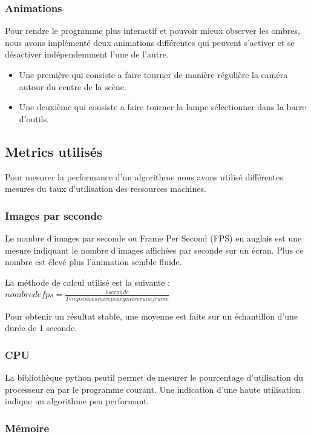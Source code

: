 \documentclass[a4paper,10pt]{report}
\begin{document}
\subsubsection{Animations}

Pour rendre le programme plus interactif et pouvoir mieux observer les ombres, nous avons implémenté deux animations différentes qui peuvent s'activer et se désactiver indépendemment l'une de l'autre.


\begin{itemize}
  \item Une première qui consiste a faire tourner de manière régulière la caméra autour du centre de la scène.
  \item Une deuxième qui consiste a faire tourner la lampe sélectionner dans la barre d'outils.
\end{itemize}

\subsection{Metrics utilisés}

Pour mesurer la performance d'un algorithme nous avons utilisé différentes mesures du taux d'utilisation des ressources machines.
\subsubsection{Images par seconde}

Le nombre d'images par seconde ou Frame Per Second (FPS) en anglais est une mesure indiquant le nombre d'images affichées par seconde sur un écran. Plus ce nombre est élevé plus l'animation semble fluide.


La méthode de calcul utilisé est la suivante : $nombre de fps = \frac{1 seconde}{Temps  nécessaire pour générer une frame}$

Pour obtenir un résultat stable, une moyenne est faite sur un échantillon d'une durée de 1 seconde.

\subsubsection{CPU}
La bibliothèque python psutil permet de mesurer le pourcentage d'utilisation du processeur en par le programme courant. Une indication d'une haute utilisation indique un algorithme peu performant.
\subsubsection{Mémoire}
\end{document}
